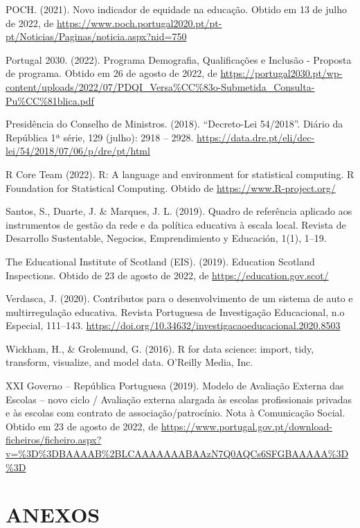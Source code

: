 \documentclass[
]{book}
\begin{document}
POCH. (2021). Novo indicador de equidade na educação. Obtido em 13 de julho de 2022, de \url{https://www.poch.portugal2020.pt/pt-pt/Noticias/Paginas/noticia.aspx?nid=750}

Portugal 2030. (2022). Programa Demografia, Qualificações e Inclusão - Proposta de programa. Obtido em 26 de agosto de 2022, de \url{https://portugal2030.pt/wp-content/uploads/2022/07/PDQI_Versa\%CC\%83o-Submetida_Consulta-Pu\%CC\%81blica.pdf}

Presidência do Conselho de Ministros. (2018). ``Decreto-Lei 54/2018''. Diário da República 1ª série, 129 (julho): 2918 -- 2928. \url{https://data.dre.pt/eli/dec-lei/54/2018/07/06/p/dre/pt/html}

R Core Team (2022). R: A language and environment for statistical computing. R Foundation for Statistical Computing. Obtido de \url{https://www.R-project.org/}

Santos, S., Duarte, J. \& Marques, J. L. (2019). Quadro de referência aplicado aos instrumentos de gestão da rede e da política educativa à escala local. Revista de Desarrollo Sustentable, Negocios, Emprendimiento y Educación, 1(1), 1--19.

The Educational Institute of Scotland (EIS). (2019). Education Scotland Inspections. Obtido de 23 de agosto de 2022, de \href{https://education.gov.scot/education-scotland/what-we-do/inspection-and-review/standards-and-evaluation-framework/08-what-do-we-focus-on-during-inspection-and-review/\#:~:text=We\%20take\%20into\%20account\%20the,the\%20capacity\%20for\%20continuous\%20improvement}{https://education.gov.scot/}

Verdasca, J. (2020). Contributos para o desenvolvimento de um sistema de auto e multirregulação educativa. Revista Portuguesa de Investigação Educacional, n.o Especial, 111--143. \url{https://doi.org/10.34632/investigacaoeducacional.2020.8503}

Wickham, H., \& Grolemund, G. (2016). R for data science: import, tidy, transform, visualize, and model data. O'Reilly Media, Inc.~

XXI Governo -- República Portuguesa (2019). Modelo de Avaliação Externa das Escolas -- novo ciclo / Avaliação externa alargada às escolas profissionais privadas e às escolas com contrato de associação/patrocínio. Nota à Comunicação Social. Obtido em 23 de agosto de 2022, de \url{https://www.portugal.gov.pt/download-ficheiros/ficheiro.aspx?v=\%3D\%3DBAAAAB\%2BLCAAAAAAABAAzN7Q0AQCs6SFGBAAAAA\%3D\%3D}

\hypertarget{anexos}{%
\chapter*{\texorpdfstring{\textbf{ANEXOS}}{ANEXOS}}\label{anexos}}
\end{document}
